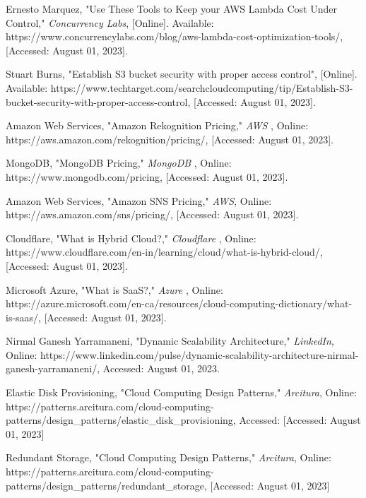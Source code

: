 \begin{sloppypar}
\begin{enumerate}[label={[\arabic*]}]
    \item Ernesto Marquez, "Use These Tools to Keep your AWS Lambda Cost Under Control," \textit{Concurrency Labs}, [Online]. Available: https://www.concurrencylabs.com/blog/aws-lambda-cost-optimization-tools/, [Accessed: August 01, 2023].

    \item Stuart Burns, "Establish S3 bucket security with proper access control",  [Online]. Available: 
    https://www.techtarget.com/searchcloudcomputing/tip/Establish-S3-bucket-security-with-proper-access-control, [Accessed: August 01, 2023].

    \item Amazon Web Services, "Amazon Rekognition Pricing," \textit{AWS} , Online: https://aws.amazon.com/rekognition/pricing/, [Accessed: August 01, 2023].

    \item MongoDB, "MongoDB Pricing," \textit{MongoDB} , Online: https://www.mongodb.com/pricing, [Accessed: August 01, 2023].

    \item Amazon Web Services, "Amazon SNS Pricing," \textit{AWS}, Online: https://aws.amazon.com/sns/pricing/, [Accessed: August 01, 2023].

    \item Cloudflare, "What is Hybrid Cloud?," \textit{Cloudflare} , Online: https://www.cloudflare.com/en-in/learning/cloud/what-is-hybrid-cloud/, [Accessed: August 01, 2023].

    \item Microsoft Azure, "What is SaaS?," \textit{Azure} , Online: https://azure.microsoft.com/en-ca/resources/cloud-computing-dictionary/what-is-saas/, [Accessed: August 01, 2023].

    \item Nirmal Ganesh Yarramaneni, "Dynamic Scalability Architecture," \textit{LinkedIn}, Online: https://www.linkedin.com/pulse/dynamic-scalability-architecture-nirmal-ganesh-yarramaneni/, Accessed: August 01, 2023.

    \item Elastic Disk Provisioning, "Cloud Computing Design Patterns," \textit{Arcitura}, Online: https://patterns.arcitura.com/cloud-computing-patterns/design\_patterns/elastic\_disk\_provisioning, Accessed: [Accessed: August 01, 2023]

    \item Redundant Storage, "Cloud Computing Design Patterns," \textit{Arcitura}, Online: https://patterns.arcitura.com/cloud-computing-patterns/design\_patterns/redundant\_storage, [Accessed: August 01, 2023]


\end{enumerate}
\end{sloppypar}
